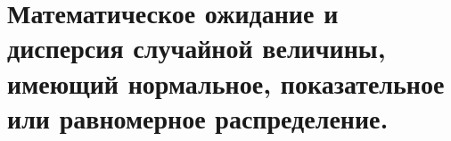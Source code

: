 \section{Математическое ожидание и дисперсия случайной величины, имеющий нормальное, показательное или равномерное распределение.}